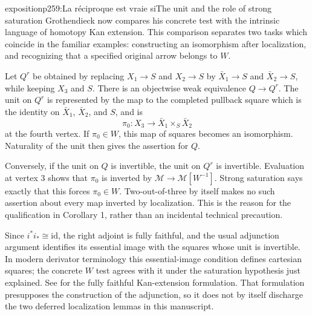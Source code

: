 \begin{dcomment}{exposition}{p259:La réciproque est vraie si}{The unit and the role of strong saturation}
Grothendieck now compares his concrete test with the intrinsic language of homotopy Kan extension. This comparison separates two tasks which coincide in the familiar examples: constructing an isomorphism after localization, and recognizing that a specified original arrow belongs to $W$.

Let $Q^r$ be obtained by replacing $X_1\to S$ and $X_2\to S$ by $\bar X_1\to S$ and $\bar X_2\to S$, while keeping $X_3$ and $S$. There is an objectwise weak equivalence $Q\to Q^r$. The unit on $Q^r$ is represented by the map to the completed pullback square which is the identity on $\bar X_1$, $\bar X_2$, and $S$, and is
\[
 \pi_0:X_3\longrightarrow\bar X_1\times_S\bar X_2
\]
at the fourth vertex. If $\pi_0\in W$, this map of squares becomes an isomorphism. Naturality of the unit then gives the assertion for $Q$.

Conversely, if the unit on $Q$ is invertible, the unit on $Q^r$ is invertible. Evaluation at vertex 3 shows that $\pi_0$ is inverted by $\mathcal M\to\mathcal M[W^{-1}]$. Strong saturation says exactly that this forces $\pi_0\in W$. Two-out-of-three by itself makes no such assertion about every map inverted by localization. This is the reason for the qualification in Corollary 1, rather than an incidental technical precaution.

Since $i^*i_*\cong\mathrm{id}$, the right adjoint is fully faithful, and the usual adjunction argument identifies its essential image with the squares whose unit is invertible. In modern derivator terminology this essential-image condition defines cartesian squares; the concrete $W$ test agrees with it under the saturation hypothesis just explained. See \citet[Proposition 1.20 and Lemma 1.21]{Groth2013} for the fully faithful Kan-extension formulation. That formulation presupposes the construction of the adjunction, so it does not by itself discharge the two deferred localization lemmas in this manuscript.
\end{dcomment}

